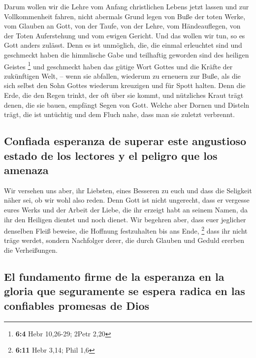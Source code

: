  Darum wollen wir die Lehre vom Anfang christlichen Lebens
jetzt lassen und zur Vollkommenheit fahren, nicht abermals Grund legen
von Buße der toten Werke, vom Glauben an Gott,  von der
Taufe, von der Lehre, vom Händeauflegen, von der Toten Auferstehung und
vom ewigen Gericht.  Und das wollen wir tun, so es Gott
anders zulässt.  Denn es ist unmöglich, die, die einmal
erleuchtet sind und geschmeckt haben die himmlische Gabe und teilhaftig
geworden sind des heiligen Geistes \footnote{\textbf{6:4} Hebr 10,26-29;
  2Petr 2,20}  und geschmeckt haben das gütige Wort Gottes
und die Kräfte der zukünftigen Welt, --  wenn sie
abfallen, wiederum zu erneuern zur Buße, als die sich selbst den Sohn
Gottes wiederum kreuzigen und für Spott halten.  Denn die
Erde, die den Regen trinkt, der oft über sie kommt, und nützliches Kraut
trägt denen, die sie bauen, empfängt Segen von Gott. 
Welche aber Dornen und Disteln trägt, die ist untüchtig und dem Fluch
nahe, dass man sie zuletzt verbrennt.

\hypertarget{confiada-esperanza-de-superar-este-angustioso-estado-de-los-lectores-y-el-peligro-que-los-amenaza}{%
\subsection{Confiada esperanza de superar este angustioso estado de los
lectores y el peligro que los
amenaza}\label{confiada-esperanza-de-superar-este-angustioso-estado-de-los-lectores-y-el-peligro-que-los-amenaza}}

 Wir versehen uns aber, ihr Liebsten, eines Besseren zu
euch und dass die Seligkeit näher sei, ob wir wohl also reden.
 Denn Gott ist nicht ungerecht, dass er vergesse eures
Werks und der Arbeit der Liebe, die ihr erzeigt habt an seinem Namen, da
ihr den Heiligen dientet und noch dienet.  Wir begehren
aber, dass euer jeglicher denselben Fleiß beweise, die Hoffnung
festzuhalten bis ans Ende, \footnote{\textbf{6:11} Hebr 3,14; Phil 1,6}
 dass ihr nicht träge werdet, sondern Nachfolger derer,
die durch Glauben und Geduld ererben die Verheißungen.

\hypertarget{el-fundamento-firme-de-la-esperanza-en-la-gloria-que-seguramente-se-espera-radica-en-las-confiables-promesas-de-dios}{%
\subsection{El fundamento firme de la esperanza en la gloria que
seguramente se espera radica en las confiables promesas de
Dios}\label{el-fundamento-firme-de-la-esperanza-en-la-gloria-que-seguramente-se-espera-radica-en-las-confiables-promesas-de-dios}}

